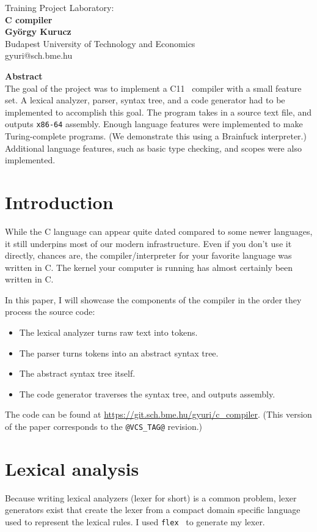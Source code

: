 \documentclass[12pt]{article}
\begin{document}
\begin{center}
	{\Large Training Project Laboratory:} \\
	{\bf \Huge C compiler} \\[3mm]
	{\bf György Kurucz} \\
	{Budapest University of Technology and Economics} \\
	{gyuri@sch.bme.hu} \\[10mm]
\end{center}

\hfil {\bf \Large Abstract} \hfil \\[1mm]
The goal of the project was to implement a C11~\cite{c11} compiler with a small
feature set. A lexical analyzer, parser, syntax tree, and a code generator had
to be implemented to accomplish this goal. The program takes in a source text
file, and outputs \texttt{x86-64} assembly. Enough language features were
implemented to make Turing-complete programs. (We demonstrate this using a
Brainfuck interpreter.) Additional language features, such as basic type
checking, and scopes were also implemented.

\section{Introduction}
While the C language can appear quite dated compared to some newer languages,
it still underpins most of our modern infrastructure. Even if you don't use it
directly, chances are, the compiler/interpreter for your favorite language was
written in C. The kernel your computer is running has almost certainly been
written in C.

In this paper, I will showcase the components of the compiler in the order they
process the source code:
\begin{itemize}
	\item The lexical analyzer turns raw text into tokens.
	\item The parser turns tokens into an abstract syntax tree.
	\item The abstract syntax tree itself.
	\item The code generator traverses the syntax tree, and outputs assembly.
\end{itemize}

The code can be found at \url{https://git.sch.bme.hu/gyuri/c_compiler}. (This
version of the paper corresponds to the \texttt{@VCS_TAG@} revision.)

\section{Lexical analysis}
Because writing lexical analyzers (lexer for short) is a common problem, lexer
generators exist that create the lexer from a compact domain specific language
used to represent the lexical rules. I used \texttt{flex}~\cite{flex} to
generate my lexer.
\end{document}
